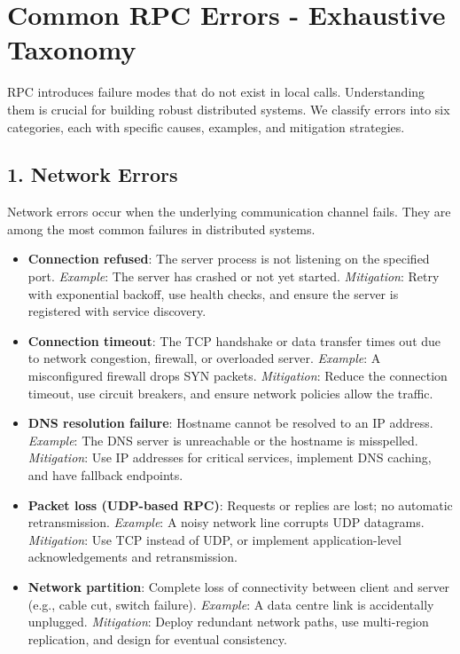 \documentclass[10pt,a4paper]{article}
\begin{document}
\section{Common RPC Errors - Exhaustive Taxonomy}
RPC introduces failure modes that do not exist in local calls. Understanding them is crucial for building robust distributed systems. We classify errors into six categories, each with specific causes, examples, and mitigation strategies.

\subsection{1. Network Errors}
Network errors occur when the underlying communication channel fails. They are among the most common failures in distributed systems.

\begin{itemize}
    \item \textbf{Connection refused}: The server process is not listening on the specified port.  
        \textit{Example}: The server has crashed or not yet started.  
        \textit{Mitigation}: Retry with exponential backoff, use health checks, and ensure the server is registered with service discovery.
    
    \item \textbf{Connection timeout}: The TCP handshake or data transfer times out due to network congestion, firewall, or overloaded server.  
        \textit{Example}: A misconfigured firewall drops SYN packets.  
        \textit{Mitigation}: Reduce the connection timeout, use circuit breakers, and ensure network policies allow the traffic.
    
    \item \textbf{DNS resolution failure}: Hostname cannot be resolved to an IP address.  
        \textit{Example}: The DNS server is unreachable or the hostname is misspelled.  
        \textit{Mitigation}: Use IP addresses for critical services, implement DNS caching, and have fallback endpoints.
    
    \item \textbf{Packet loss (UDP-based RPC)}: Requests or replies are lost; no automatic retransmission.  
        \textit{Example}: A noisy network line corrupts UDP datagrams.  
        \textit{Mitigation}: Use TCP instead of UDP, or implement application-level acknowledgements and retransmission.
    
    \item \textbf{Network partition}: Complete loss of connectivity between client and server (e.g., cable cut, switch failure).  
        \textit{Example}: A data centre link is accidentally unplugged.  
        \textit{Mitigation}: Deploy redundant network paths, use multi-region replication, and design for eventual consistency.
\end{itemize}
\end{document}
